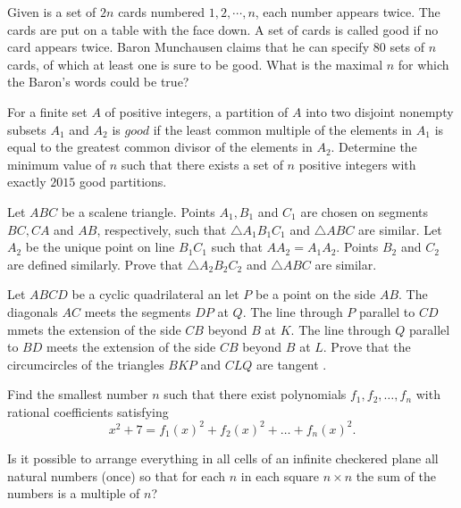 \documentclass[11pt]{scrartcl}
\begin{document}
\begin{problem}[2989958142304279488]
Given is a set of $2n$ cards numbered $1,2, \cdots, n$, each number appears twice. The cards are put on a table with the face down. A set of cards is called good if no card appears twice. Baron Munchausen claims that he can specify $80$ sets of $n$ cards, of which at least one is sure to be good. What is the maximal $n$ for which the Baron's words could be true?
\end{problem}
\begin{problem}[3004928220875310213]
For a finite set $A$ of positive integers, a partition of $A$ into two disjoint nonempty subsets $A_1$ and $A_2$ is $\textit{good}$ if the least common multiple of the elements in $A_1$ is equal to the greatest common divisor of the elements in $A_2$. Determine the minimum value of $n$ such that there exists a set of $n$ positive integers with exactly $2015$ good partitions.
\end{problem}
\begin{problem}[3031913484181592371]
Let $ABC$ be a scalene triangle. Points $A_1,B_1$ and $C_1$ are chosen on segments $BC,CA$ and $AB$, respectively, such that $\triangle A_1B_1C_1$ and $\triangle ABC$ are similar. Let $A_2$ be the unique point on line $B_1C_1$ such that $AA_2=A_1A_2$. Points $B_2$ and $C_2$ are defined similarly. Prove that $\triangle A_2B_2C_2$ and $\triangle ABC$ are similar.
\end{problem}
\begin{problem}[3032245772349874005]
	Let $ABCD$ be a cyclic quadrilateral an let $P$ be a point on the side $AB.$ The diagonals $AC$ meets the segments $DP$ at $Q.$ The line through $P$ parallel to $CD$ mmets the extension of the side $CB$ beyond $B$ at $K.$ The line through $Q$ parallel to $BD$ meets the extension of the side $CB$ beyond $B$ at $L.$ Prove that the circumcircles of the triangles $BKP$ and $CLQ$ are tangent .
\end{problem}
\begin{problem}[3037670535896233971]
Find the smallest number $n$ such that there exist polynomials $f_1, f_2, \ldots , f_n$ with rational coefficients satisfying\[x^2+7 = f_1\left(x\right)^2 + f_2\left(x\right)^2 + \ldots + f_n\left(x\right)^2.\]
\end{problem}
\begin{problem}[3048608408918882691]
	Is it possible to arrange everything in all cells of an infinite checkered plane all natural numbers (once) so that for each $n$ in each square $n \times n$ the sum of the numbers is a multiple of $n$?
\end{problem}
\end{document}
